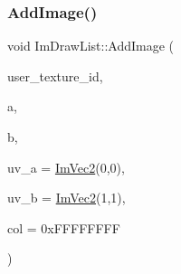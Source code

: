 \hypertarget{struct_im_draw_list_ac37cd998bf5f40705c7445004a029b66}{}\label{struct_im_draw_list_ac37cd998bf5f40705c7445004a029b66} 
\subsubsection{\texorpdfstring{Add\+Image()}{AddImage()}}
{\footnotesize\ttfamily void Im\+Draw\+List\+::\+Add\+Image (\begin{DoxyParamCaption}\item[{Im\+Texture\+ID}]{user\+\_\+texture\+\_\+id,  }\item[{const \hyperlink{struct_im_vec2}{Im\+Vec2} \&}]{a,  }\item[{const \hyperlink{struct_im_vec2}{Im\+Vec2} \&}]{b,  }\item[{const \hyperlink{struct_im_vec2}{Im\+Vec2} \&}]{uv\+\_\+a = {\ttfamily \hyperlink{struct_im_vec2}{Im\+Vec2}(0,0)},  }\item[{const \hyperlink{struct_im_vec2}{Im\+Vec2} \&}]{uv\+\_\+b = {\ttfamily \hyperlink{struct_im_vec2}{Im\+Vec2}(1,1)},  }\item[{Im\+U32}]{col = {\ttfamily 0xFFFFFFFF} }\end{DoxyParamCaption})}

\hypertarget{struct_im_draw_list_a1cc1f8d4d1812c65c7887b8d5aef31fe}{}\label{struct_im_draw_list_a1cc1f8d4d1812c65c7887b8d5aef31fe} 
